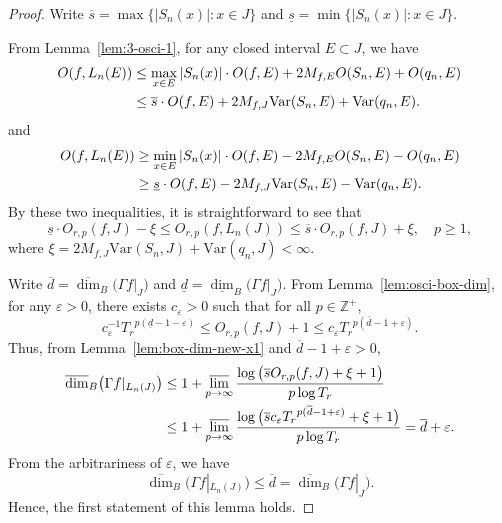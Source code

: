 \documentclass[11pt]{amsart}
\theoremstyle{definition}
\theoremstyle{remark}
\numberwithin{equation}{section}
\newcommand{\Z}{{\mathbb Z}}
\newcommand{\upd}{{\overline{d}}}
\newcommand{\lowd}{{\underline{d}}}
\newcommand{\ups}{{\overline{s} }}
\newcommand{\lows}{{\underline{s}}}
\newcommand{\Var}{\mathrm{Var}}
\def\vep{\varepsilon}
\def\updimB{\overline{\dim}_B}
\def\lowdimB{\underline{\dim}_B}
\begin{document}
\begin{proof}
	Write $\ups =\max \big\{ \big| S_n(x) \big|: x \in J \big\}$ and 
	$\lows =\min \big\{ \big| S_n(x) \big|: x \in J  \big\}$. 
	
	From Lemma~\ref{lem:3-osci-1}, for any closed interval $E\subset J$, we have
	\begin{align*}
		O(f,L_n(E))&\leq \max_{x\in E} |S_n(x)| \cdot O(f,E)+ 2 M_{f,E} O(S_n,E)+O(q_n,E)\notag\\
		&\leq 	\ups \cdot O(f,E)+ 2 M_{f,J} \Var(S_n,E)+\Var(q_n,E). 
	\end{align*}
    and	
    \begin{align*}
    	O(f,L_n(E))&\geq \min_{x\in E} |S_n(x)| \cdot O(f,E)- 2 M_{f,E} O(S_n,E)-O(q_n,E)\notag\\
    	&\geq 	\lows \cdot O(f,E)- 2 M_{f,J} \Var(S_n,E)-\Var(q_n,E). 
    \end{align*}
	By these two inequalities, it is straightforward to see that
	\begin{equation}\label{eq:Lem4-3-1} 
	    \lows \cdot  O_{r,p}(f,J)-\xi \leq  O_{r,p}(f,L_n(J))\leq \ups \cdot O_{r,p}(f,J)+ \xi, \quad  p \geq 1,
    \end{equation}
	where $\xi=2 M_{f,J} \Var(S_n,J)+\Var(q_n,J)<\infty$. 
	
	
	
	Write $\upd= \updimB \big(\Gamma f|_{J}\big)$ and $\lowd=\lowdimB \big(\Gamma f|_{J}\big)$.
	From Lemma~\ref{lem:osci-box-dim}, for any $\vep>0$, there exists $c_\vep>0$ such that for all $p\in \Z^+$,
	\begin{equation}\label{eq:Lem4-3-2}
		c_\vep^{-1} {T_r}^{p ( \lowd -1-\vep)}
		\leq O_{r,p}(f,J) +1
		\leq c_\vep {T_r}^{p ( \upd -1+\vep )}.
	\end{equation}
	Thus, from Lemma~\ref{lem:box-dim-new-x1} and $\upd -1+\vep>0$,
	\begin{align*}
		\updimB \big(\Gamma f|_{L_n(J)}\big) 
		&\leq 1+\varlimsup_{p \to \infty} \frac{\log \big(\ups O_{r,p}(f,J)+\xi+1\big)}{p \log T_r} \\
		&\leq 1+\varlimsup_{p \to \infty} \frac{\log \big(\ups c_\vep  {T_r}^{p ( \upd -1+\vep)}+\xi+1\big)}{p \log T_r} 
		= \upd+\vep .
	\end{align*}
	From the arbitrariness of $\vep$, we have
	\begin{equation}\label{eq:Lem4-3-3}
		 \updimB \big(\Gamma f|_{L_n(J)}\big) \leq  \upd = \updimB \big(\Gamma f|_{J}\big).
	\end{equation}
	Hence, the first statement of this lemma holds.
	

\end{proof}
\end{document}
